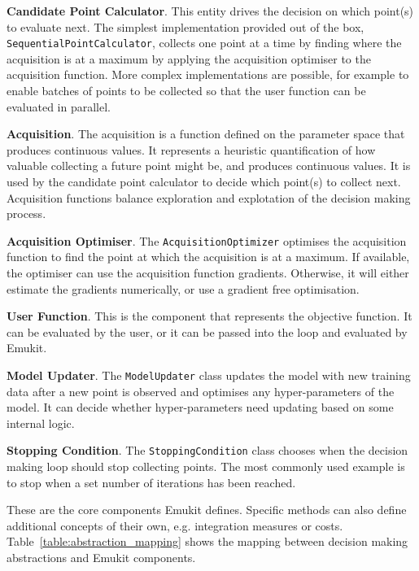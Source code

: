 \textbf{Candidate Point Calculator}. This entity drives the decision on which point(s) to evaluate next. The simplest implementation provided out of the box, \texttt{SequentialPointCalculator}, collects one point at a time by finding where the acquisition is at a maximum by applying the acquisition optimiser to the acquisition function. More complex implementations are possible, for example to enable batches of points to be collected so that the user function can be evaluated in parallel.

\textbf{Acquisition}. The acquisition is a function defined on the parameter space that produces continuous values. It represents a heuristic quantification of how valuable collecting a future point might be, and produces continuous values. It is used by the candidate point calculator to decide which point(s) to collect next. Acquisition functions balance exploration and explotation of the decision making process.

\textbf{Acquisition Optimiser}. The \texttt{AcquisitionOptimizer} optimises the acquisition function to find the point at which the acquisition is at a maximum. If available, the optimiser can use the acquisition function gradients. Otherwise, it will either estimate the gradients numerically, or use a gradient free optimisation.

\textbf{User Function}. This is the component that represents the objective function. It can be evaluated by the user, or it can be passed into the loop and evaluated by Emukit.

\textbf{Model Updater}. The \texttt{ModelUpdater} class updates the model with new training data after a new point is observed and optimises any hyper-parameters of the model. It can decide whether hyper-parameters need updating based on some internal logic.

\textbf{Stopping Condition}. The \texttt{StoppingCondition} class chooses when the decision making loop should stop collecting points. The most commonly used example is to stop when a set number of iterations has been reached.

These are the core components Emukit defines. Specific methods can also define additional concepts of their own, e.g. integration measures or costs. Table~\ref{table:abstraction_mapping} shows the mapping between decision making abstractions and Emukit components.

